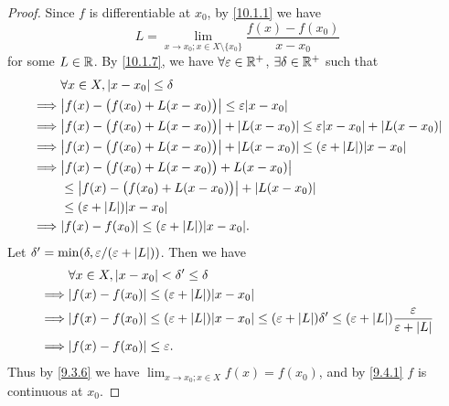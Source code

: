 \begin{proof}
  Since \(f\) is differentiable at \(x_0\), by \cref{10.1.1} we have
  \[
    L = \lim_{x \to x_0 ; x \in X \setminus \{x_0\}} \dfrac{f(x) - f(x_0)}{x - x_0}
  \]
  for some \(L \in \mathbb{R}\).
  By \cref{10.1.7}, we have \(\forall \varepsilon \in \mathbb{R}^+\), \(\exists \delta \in \mathbb{R}^+\) such that
  \begin{align*}
             & \forall x \in X, \abs{x - x_0} \leq \delta                                                                      \\
    \implies & \abs{f(x) - \big(f(x_0) + L(x - x_0)\big)} \leq \varepsilon \abs{x - x_0}                                       \\
    \implies & \abs{f(x) - \big(f(x_0) + L(x - x_0)\big)} + \abs{L(x - x_0)} \leq \varepsilon \abs{x - x_0} + \abs{L(x - x_0)} \\
    \implies & \abs{f(x) - \big(f(x_0) + L(x - x_0)\big)} + \abs{L(x - x_0)} \leq (\varepsilon + \abs{L}) \abs{x - x_0}        \\
    \implies & \abs{f(x) - \big(f(x_0) + L(x - x_0)\big) + L(x - x_0)}                                                         \\
             & \leq \abs{f(x) - \big(f(x_0) + L(x - x_0)\big)} + \abs{L(x - x_0)}                                              \\
             & \leq (\varepsilon + \abs{L}) \abs{x - x_0}                                                                      \\
    \implies & \abs{f(x) - f(x_0)} \leq (\varepsilon + \abs{L}) \abs{x - x_0}.
  \end{align*}
  Let \(\delta' = \min(\delta, \varepsilon / (\varepsilon + \left\lvert L\right\rvert))\).
  Then we have
  \begin{align*}
             & \forall x \in X, \abs{x - x_0} < \delta' \leq \delta                                                                                                                        \\
    \implies & \abs{f(x) - f(x_0)} \leq (\varepsilon + \abs{L}) \abs{x - x_0}                                                                                                              \\
    \implies & \abs{f(x) - f(x_0)} \leq (\varepsilon + \abs{L}) \abs{x - x_0} \leq (\varepsilon + \abs{L}) \delta' \leq (\varepsilon + \abs{L}) \dfrac{\varepsilon}{\varepsilon + \abs{L}} \\
    \implies & \abs{f(x) - f(x_0)} \leq \varepsilon.
  \end{align*}
  Thus by \cref{9.3.6} we have \(\lim_{x \to x_0 ; x \in X} f(x) = f(x_0)\), and by \cref{9.4.1} \(f\) is continuous at \(x_0\).
\end{proof}

